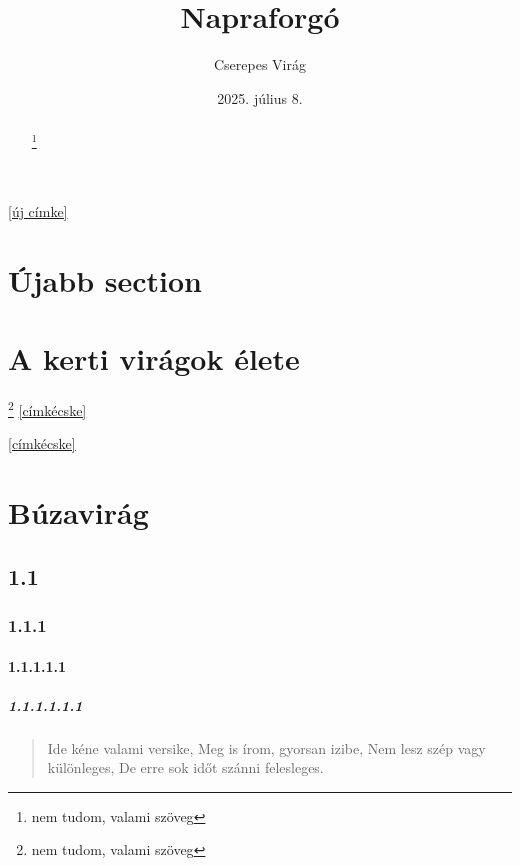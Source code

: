\documentclass{article}
\begin{document}
\autoref{új címke}
\section[Új]{Újabb section}
\label{új címke}
\hulipsum
\fancyhead[R]{\thepage}
\begin{abstract}

\hulipsum
\footnote{nem tudom, valami szöveg}
\end{abstract}
\title{Napraforgó}
\author{Cserepes Virág}
\date{2025. július 8.}
\maketitle

\renewcommand{\thefootnote}{\fnsymbol{footnote}}

\section[Virágok]{A kerti virágok élete}
\footnote{nem tudom, valami szöveg}
\ref{címkécske}
\pageref{címkécske}

\autoref{címkécske}
\subsection{}
\hulipsum
\label{https://idegen-szavak.hu/}
\subsection{}
\hulipsum
\section[A búzavirág]{Búzavirág}
\subsection{1.1}
\subsubsection{1.1.1}
\paragraph{1.1.1.1.1}
\subparagraph{1.1.1.1.1.1}
\tableofcontents
\setcounter{tocdepth}{1.1.1}

\begin{verse}
Ide kéne valami versike,
Meg is írom, gyorsan izibe,
Nem lesz szép vagy különleges,
De erre sok időt szánni felesleges.
\end{verse}
\end{document}
